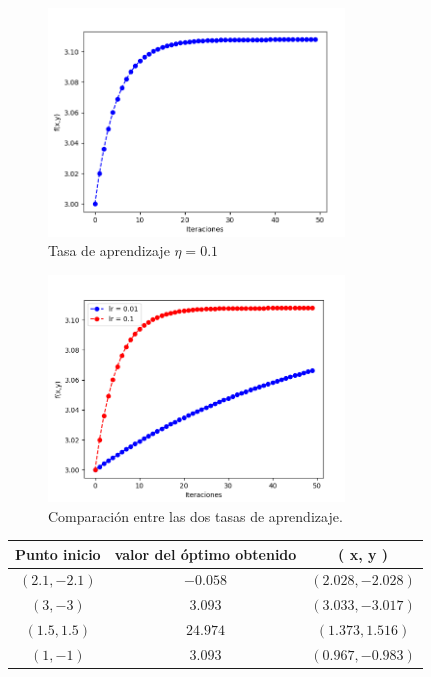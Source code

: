 \documentclass[size=a4, parskip=half, titlepage=false, toc=flat, toc=bib, 12pt]{scrartcl}
\begin{document}
\begin{figure}[H]
\centering
\includegraphics[width=0.7\textwidth]{./img/bonus22}
\caption{Tasa de aprendizaje $\eta = 0.1$}
\end{figure}

\begin{figure}[H]
\centering
\includegraphics[width=0.7\textwidth]{./img/bonus23}
\caption{Comparación entre las dos tasas de aprendizaje.}
\end{figure}

\begin{table}[H]
\centering
\begin{tabular}{ccc}
\hline
Punto inicio   & valor del óptimo obtenido                    & ( x, y )                                 \\ \hline
$(2.1 , -2.1)$ & {\color[HTML]{000000} $-0.058$} & {\color[HTML]{000000} $(2.028, -2.028)$} \\ \hline
$(3, -3)$      & {\color[HTML]{000000} $3.093$}  & {\color[HTML]{000000} $(3.033, -3.017)$} \\ \hline
$(1.5, 1.5)$   & {\color[HTML]{000000} $24.974$} & {\color[HTML]{000000} $(1.373, 1.516)$}  \\ \hline
$(1, -1)$      & {\color[HTML]{000000} $3.093$}  & {\color[HTML]{000000} $(0.967, -0.983)$} \\ \hline
\end{tabular}
\end{table}

\end{document}
